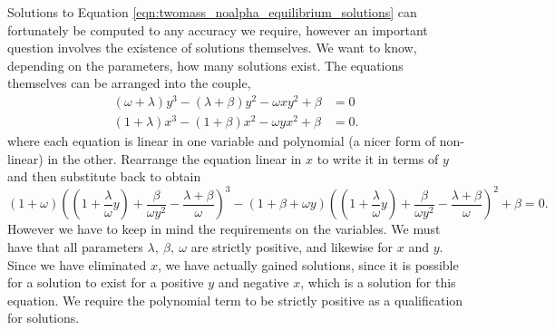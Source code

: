Solutions to Equation \ref{eqn:twomass_noalpha_equilibrium_solutions} can fortunately be computed to any accuracy we require,
however an important question involves the existence of solutions themselves.
We want to know, depending on the parameters, how many solutions exist.
The equations themselves can be arranged into the couple,
\begin{equation}
    \begin{aligned}
        (\omega + \lambda)y^3 - (\lambda + \beta)y^2 - \omega x y^2 + \beta &= 0 \\
        (1 + \lambda)x^3 - (1 + \beta)x^2 - \omega y x^2 + \beta &= 0.
    \end{aligned}
\end{equation}
where each equation is linear in one variable and polynomial (a nicer form of non-linear) in the other.
Rearrange the equation linear in $x$ to write it in terms of $y$ and then substitute back to obtain
\begin{equation}
    (1+\omega)\left( \left( 1 + \frac{\lambda}{\omega}y \right) + \frac{\beta}{\omega y^2} - \frac{\lambda + \beta}{\omega}\right)^3 - (1+\beta+\omega y)\left( \left( 1 + \frac{\lambda}{\omega}y \right) + \frac{\beta}{\omega y^2} - \frac{\lambda + \beta}{\omega}\right)^2 + \beta = 0.
    \label{eqn:twomass_equilibria_polynomial}
\end{equation}
However we have to keep in mind the requirements on the variables.
We must have that all parameters \(\lambda,~\beta,~\omega\) are strictly positive, and likewise for \(x\) and \(y\).
Since we have eliminated $x$, we have actually gained solutions, since it is possible for a solution to exist for a positive $y$ and negative $x$, which is a solution for this equation.
We require the polynomial term to be strictly positive as a qualification for solutions. %

